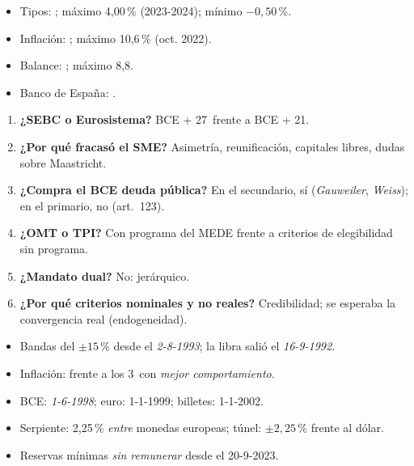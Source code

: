 \documentclass{article}
\begin{document}
\begin{columnas}
\anexorepaso
{}
\begin{itemize}
\item Tipos: ; máximo 4,00\,\% (2023-2024); mínimo $-0{,}50$\,\%.
\item Inflación: ; máximo 10,6\,\% (oct. 2022).
\item Balance: ; máximo 8,8.
\item Banco de España: .
\end{itemize}
\begin{enumerate}
\item \textbf{¿SEBC o Eurosistema?} BCE + 27~frente a BCE + 21.
\item \textbf{¿Por qué fracasó el SME?} Asimetría, reunificación, capitales libres, dudas sobre Maastricht.
\item \textbf{¿Compra el BCE deuda pública?} En el secundario, sí (\emph{Gauweiler}, \emph{Weiss}); en el primario, no (art.~123).
\item \textbf{¿OMT o TPI?} Con programa del MEDE frente a criterios de elegibilidad sin programa.
\item \textbf{¿Mandato dual?} No: jerárquico.
\item \textbf{¿Por qué criterios nominales y no reales?} Credibilidad; se esperaba la convergencia real (endogeneidad).
\end{enumerate}
\begin{trampa}
\begin{itemize}
\item Bandas del $\pm15$\,\% desde el \emph{2-8-1993}; la libra salió el \emph{16-9-1992}.
\item Inflación: frente a los 3~con \emph{mejor comportamiento}.
\item BCE: \emph{1-6-1998}; euro: 1-1-1999; billetes: 1-1-2002.
\item Serpiente: 2,25\,\% \emph{entre} monedas europeas; túnel: $\pm2{,}25$\,\% frente al dólar.
\item Reservas mínimas \emph{sin remunerar} desde el 20-9-2023.
\end{itemize}
\end{trampa}

\end{columnas}
\end{document}
